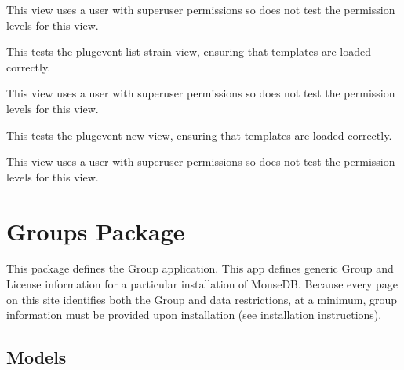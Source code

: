 \documentclass[letterpaper,10pt,english]{sphinxmanual}
\begin{document}
\begin{fulllineitems}
\begin{fulllineitems}
This view uses a user with superuser permissions so does not test the permission levels for this view.

\end{fulllineitems}


\begin{fulllineitems}
\label{api:mousedb.timed_mating.tests.Timed_MatingViewTests.test_plugevent_list_strain}
This tests the plugevent-list-strain view, ensuring that templates are loaded correctly.

This view uses a user with superuser permissions so does not test the permission levels for this view.

\end{fulllineitems}


\begin{fulllineitems}
\label{api:mousedb.timed_mating.tests.Timed_MatingViewTests.test_plugevent_new}
This tests the plugevent-new view, ensuring that templates are loaded correctly.

This view uses a user with superuser permissions so does not test the permission levels for this view.

\end{fulllineitems}


\end{fulllineitems}



\section{Groups Package}
\label{api:groups-package}\label{api:module-mousedb.groups}
This package defines the Group application.
This app defines generic Group and License information for a particular installation of MouseDB.  
Because every page on this site identifies both the Group and data restrictions, at a minimum, group information must be provided upon installation (see installation instructions).


\subsection{Models}
\label{api:id13}\label{api:module-mousedb.groups.models}
\end{document}
